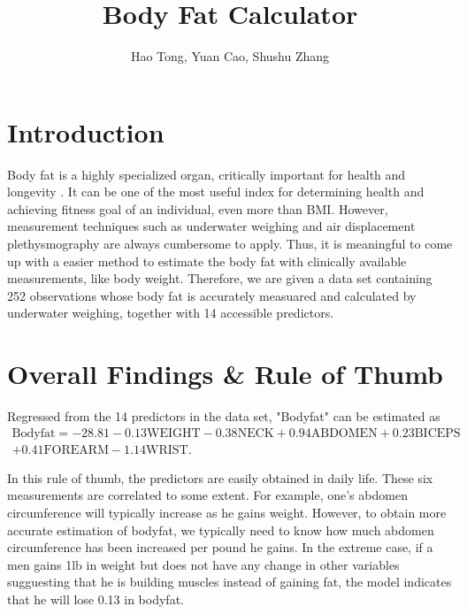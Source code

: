 \documentclass[12pt, letterpaper]{article}
\title{Body Fat Calculator}
\author{Hao Tong, Yuan Cao, Shushu Zhang}
\begin{document}
\maketitle

\section{Introduction}

Body fat is a highly specialized organ, critically important for health and longevity \cite{ludwig2016always}. It can be one of the most useful index for determining health and achieving fitness goal of an individual, even more than BMI. However, measurement techniques such as underwater weighing and air displacement plethysmography are always cumbersome to apply. Thus, it is meaningful to come up with a easier method to estimate the body fat with clinically available measurements, like body weight. Therefore, we are given a data set containing 252 observations whose body fat is accurately measuared and calculated by underwater weighing, together with 14 accessible predictors. 

\section{Overall Findings \& Rule of Thumb}
\label{sec:2}
Regressed from the 14 predictors in the data set, "Bodyfat" can be estimated as
\begin{equation}\label{eq:model}
\begin{aligned}
\mathrm{Bodyfat}=
-28.81-0.13\mathrm{WEIGHT}-0.38\mathrm{NECK}+0.94\mathrm{ABDOMEN}+0.23\mathrm{BICEPS}\\
+0.41\mathrm{FOREARM}-1.14\mathrm{WRIST}.
\end{aligned}
\end{equation}
 
In this rule of thumb, the predictors are easily obtained in daily life. These six measurements are correlated to some extent. For example, one's abdomen circumference will typically increase as he gains weight. However, to obtain more accurate estimation of bodyfat, we typically need to know how much abdomen circumference has been increased per pound he gains. In the extreme case, if a men gains 1lb in weight but does not have any change in other variables sugguesting that he is building muscles instead of gaining fat, the model indicates that he will lose 0.13 in bodyfat. 
\end{document}
